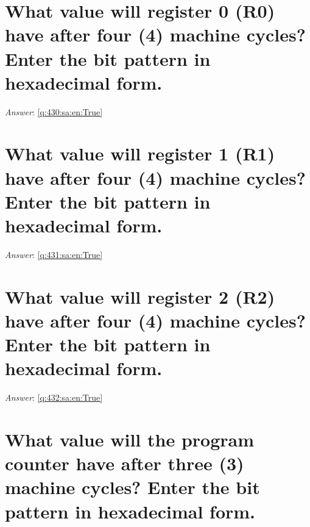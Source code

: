 \documentclass[a4paper,11pt,oneside]{book}
\begin{document}
\begin{sloppypar}
\section{What value will register 0 (R0) have after four (4) machine cycles? Enter the bit pattern in hexadecimal form.}

\label{q:430:sa:en:False}

\vspace{2cm}

\noindent\makebox[\textwidth]{\hrulefill}

\vspace{1cm}

\textit{Answer}: \autoref{q:430:sa:en:True}



\section{What value will register 1 (R1) have after four (4) machine cycles? Enter the bit pattern in hexadecimal form.}

\label{q:431:sa:en:False}

\vspace{2cm}

\noindent\makebox[\textwidth]{\hrulefill}

\vspace{1cm}

\textit{Answer}: \autoref{q:431:sa:en:True}



\section{What value will register 2 (R2) have after four (4) machine cycles? Enter the bit pattern in hexadecimal form.}

\label{q:432:sa:en:False}

\vspace{2cm}

\noindent\makebox[\textwidth]{\hrulefill}

\vspace{1cm}

\textit{Answer}: \autoref{q:432:sa:en:True}



\section{What value will the program counter have after three (3) machine cycles? Enter the bit pattern in hexadecimal form.}


\end{sloppypar}
\end{document}
